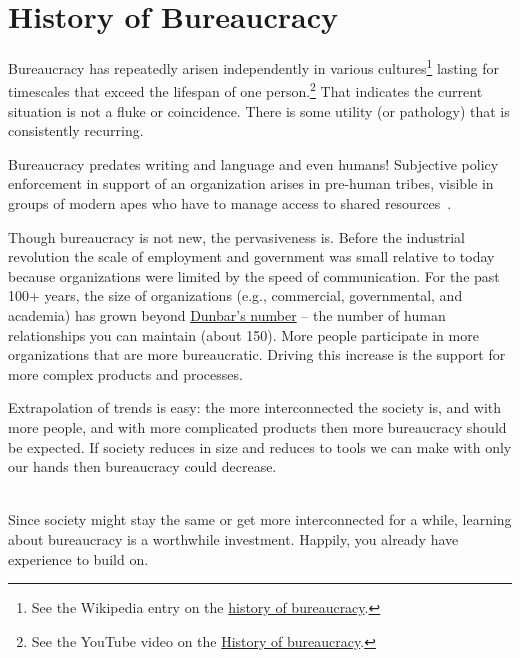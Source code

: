 \section{History of Bureaucracy\label{sec:history}}


Bureaucracy has repeatedly arisen independently in various cultures\footnote{See the Wikipedia entry on the \href{https://en.wikipedia.org/wiki/Bureaucracy\%23History}{history of bureaucracy}.%
}
lasting for timescales that exceed the lifespan of one person.\footnote{See the YouTube video on the \href{https://www.youtube.com/watch?v=B_nsZlcC12g}{History of bureaucracy}.} That indicates the current situation is not a fluke or coincidence. There is some utility (or pathology) that is consistently recurring. 


Bureaucracy predates writing and language and even humans! Subjective policy enforcement in support of an organization arises in pre-human tribes, visible in groups of modern apes who have to manage access to shared resources~\cite{2016_Suchak}. 



Though bureaucracy is not new, the pervasiveness is. Before the industrial revolution the scale of employment and government was small relative to today because organizations were limited by the speed of communication. For the past 100+ years, the size of organizations (e.g., commercial, governmental, and academia) has grown beyond \href{https://en.wikipedia.org/wiki/Dunbar\%27s_number}{Dunbar's number} -- the number of human relationships you can maintain (about 150). \iftoggle{WPinmargin}{\marginpar{$>$Wikipedia: Dunbar's number}}{}
More people participate in more organizations that are more bureaucratic. Driving this increase is the support for more complex products and processes. 


Extrapolation of trends is easy: the more interconnected the society is, and with more people, and with more complicated products then more bureaucracy should be expected. If society reduces in size and reduces to tools we can make with only our hands then bureaucracy could decrease. 


\ \\

Since society might stay the same or get more interconnected for a while, learning about bureaucracy is a worthwhile investment. Happily, you already have experience to build on. 